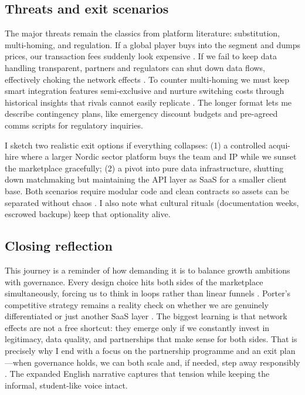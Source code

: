 \subsection*{Threats and exit scenarios}
The major threats remain the classics from platform literature: substitution, multi-homing, and regulation. If a global player buys into the segment and dumps prices, our transaction fees suddenly look expensive \citep{Porter2008}. If we fail to keep data handling transparent, partners and regulators can shut down data flows, effectively choking the network effects \citep{Srnicek2017}. To counter multi-homing we must keep smart integration features semi-exclusive and nurture switching costs through historical insights that rivals cannot easily replicate \citep{FarrellSaloner1986}. The longer format lets me describe contingency plans, like emergency discount budgets and pre-agreed comms scripts for regulatory inquiries.

I sketch two realistic exit options if everything collapses: (1) a controlled acqui-hire where a larger Nordic sector platform buys the team and IP while we sunset the marketplace gracefully; (2) a pivot into pure data infrastructure, shutting down matchmaking but maintaining the API layer as SaaS for a smaller client base. Both scenarios require modular code and clean contracts so assets can be separated without chaos \citep{Reillier2017}. I also note what cultural rituals (documentation weeks, escrowed backups) keep that optionality alive.

\subsection*{Closing reflection}
This journey is a reminder of how demanding it is to balance growth ambitions with governance. Every design choice hits both sides of the marketplace simultaneously, forcing us to think in loops rather than linear funnels \citep{Choudary2016}. Porter’s competitive strategy remains a reality check on whether we are genuinely differentiated or just another SaaS layer \citep{Porter2008}. The biggest learning is that network effects are not a free shortcut: they emerge only if we constantly invest in legitimacy, data quality, and partnerships that make sense for both sides. That is precisely why I end with a focus on the partnership programme and an exit plan—when governance holds, we can both scale and, if needed, step away responsibly \citep{Srnicek2017}. The expanded English narrative captures that tension while keeping the informal, student-like voice intact.
